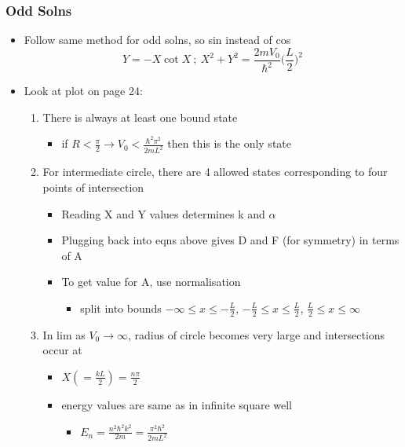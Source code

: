 \documentclass[a4paper,11pt,normalem]{article}
\begin{document}
\subsubsection{Odd Solns}
\begin{itemize}
\item
  Follow same method for odd solns, so sin instead of cos \[
  Y = -X\cot X ~;~ X^2 + Y^2 = \frac{2mV_0}{\hbar^2}\Big(\frac{L}{2} \Big)^2
  \]
\item
  Look at plot on page 24:
  \begin{enumerate}
  \item
    There is always at least one bound state
    \begin{itemize}
    \item
      if \(R < \frac{\pi}{2} \to V_0 < \frac{\hbar^{2}\pi^2}{2mL^2}\)
      then this is the only state
    \end{itemize}
  \item
    For intermediate circle, there are 4 allowed states corresponding to four points of intersection
    \begin{itemize}
    \item
      Reading X and Y values determines k and \(\alpha\)
    \item
      Plugging back into eqns above gives D and F (for symmetry) in
      terms of A
    \item
      To get value for A, use normalisation
      \begin{itemize}
      \item
        split into bounds \(-\infty \leq x \leq -\frac{L}{2}\),
        \(-\frac{L}{2} \leq x \leq \frac{L}{2}\),
        \(\frac{L}{2} \leq x \leq \infty\)
      \end{itemize}
    \end{itemize}
  \item
    In lim as \(V_0 \to \infty\), radius of circle becomes very large
    and intersections occur at
    \begin{itemize}
    \item
      \(X(= \frac{kL}{2}) = \frac{n\pi}{2}\)
    \item
      energy values are same as in infinite square well
      \begin{itemize}
      \item
        \(E_n = \frac{n^{2}\hbar^{2}k^2}{2m} = \frac{\pi^{2}\hbar^{2}}{2mL^2}\)
      \end{itemize}
    \end{itemize}
  \end{enumerate}
\end{itemize}
\end{document}
